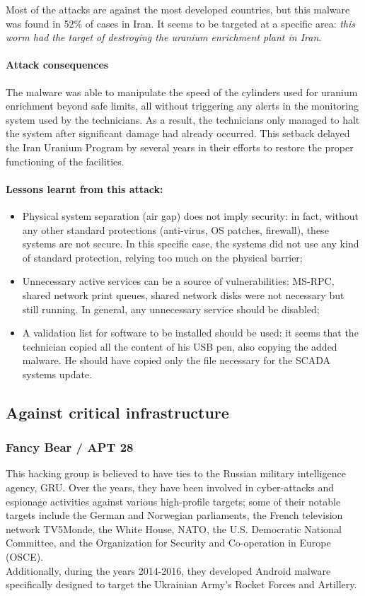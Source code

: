 Most of the attacks are against the most developed countries, but this malware was found in 52\% of cases in Iran. It seems to be targeted at a specific area: \emph{this worm had the target of destroying the uranium enrichment plant in Iran}.

\paragraph{Attack consequences}
The malware was able to manipulate the speed of the cylinders used for uranium enrichment beyond safe limits, all without triggering any alerts in the monitoring system used by the technicians. As a result, the technicians only managed to halt the system after significant damage had already occurred. This setback delayed the Iran Uranium Program by several years in their efforts to restore the proper functioning of the facilities.


\paragraph{Lessons learnt from this attack:}
\begin{itemize}
	\item Physical system separation (air gap) does not imply security: in fact, without any other standard protections (anti-virus, OS patches, firewall), these systems are not secure. In this specific case, the systems did not use any kind of standard protection, relying too much on the physical barrier;
	\item Unnecessary active services can be a source of vulnerabilities: MS-RPC, shared network print queues, shared network disks were not necessary but still running. In general, any unnecessary service should be disabled;
	\item A validation list for software to be installed should be used: it seems that the technician copied all the content of his USB pen, also copying the added malware. He should have copied only the file necessary for the SCADA systems update.
\end{itemize}



\subsection{Against critical infrastructure}

\subsubsection{Fancy Bear / APT 28}
This hacking group is believed to have ties to the Russian military intelligence agency, GRU. Over the years, they have been involved in cyber-attacks and espionage activities against various high-profile targets; some of their notable targets include the German and Norwegian parliaments, the French television network TV5Monde, the White House, NATO, the U.S. Democratic National Committee, and the Organization for Security and Co-operation in Europe (OSCE). \\
Additionally, during the years 2014-2016, they developed Android malware specifically designed to target the Ukrainian Army's Rocket Forces and Artillery.


